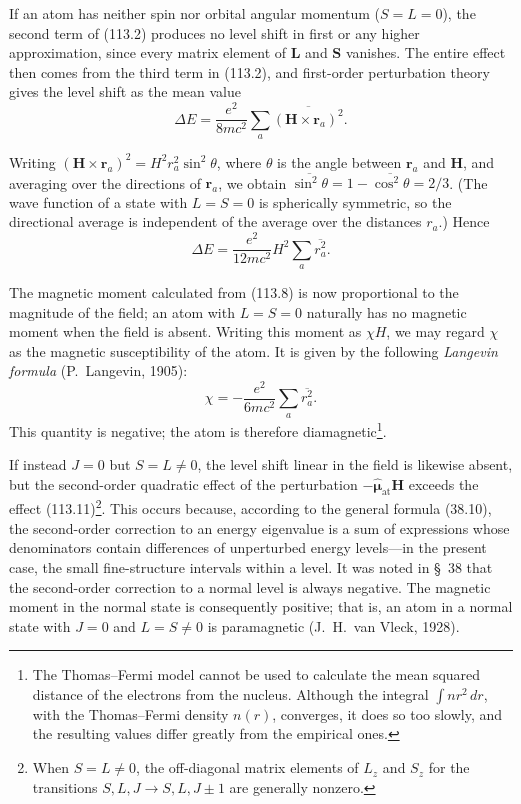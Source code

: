 If an atom has neither spin nor orbital angular momentum ($S=L=0$), the second term of (113.2) produces no level shift in first or any higher approximation, since every matrix element of $\mathbf L$ and $\mathbf S$ vanishes. The entire effect then comes from the third term in (113.2), and first-order perturbation theory gives the level shift as the mean value
\begin{equation}
 \Delta E=\frac{e^2}{8mc^2}\sum_a\overline{(\mathbf H\times\mathbf r_a)^2}.
 \tag{113.10}
\end{equation}

Writing $(\mathbf H\times\mathbf r_a)^2=H^2r_a^2\sin^2\theta$, where $\theta$ is the angle between $\mathbf r_a$ and $\mathbf H$, and averaging over the directions of $\mathbf r_a$, we obtain $\overline{\sin^2\theta}=1-\overline{\cos^2\theta}=2/3$. (The wave function of a state with $L=S=0$ is spherically symmetric, so the directional average is independent of the average over the distances $r_a$.) Hence
\begin{equation}
 \Delta E=\frac{e^2}{12mc^2}H^2\sum_a\overline{r_a^2}.
 \tag{113.11}
\end{equation}

The magnetic moment calculated from (113.8) is now proportional to the magnitude of the field; an atom with $L=S=0$ naturally has no magnetic moment when the field is absent. Writing this moment as $\chi H$, we may regard $\chi$ as the magnetic susceptibility of the atom. It is given by the following \emph{Langevin formula} (P.~Langevin, 1905):
\begin{equation}
 \chi=-\frac{e^2}{6mc^2}\sum_a\overline{r_a^2}.
 \tag{113.12}
\end{equation}
This quantity is negative; the atom is therefore diamagnetic\footnote{The Thomas--Fermi model cannot be used to calculate the mean squared distance of the electrons from the nucleus. Although the integral $\int nr^2\,dr$, with the Thomas--Fermi density $n(r)$, converges, it does so too slowly, and the resulting values differ greatly from the empirical ones.}.

If instead $J=0$ but $S=L\ne0$, the level shift linear in the field is likewise absent, but the second-order quadratic effect of the perturbation $-\hat{\boldsymbol\mu}_{\text{at}}\mathbf H$ exceeds the effect (113.11)\footnote{When $S=L\ne0$, the off-diagonal matrix elements of $L_z$ and $S_z$ for the transitions $S,L,J\to S,L,J\pm1$ are generally nonzero.}. This occurs because, according to the general formula (38.10), the second-order correction to an energy eigenvalue is a sum of expressions whose denominators contain differences of unperturbed energy levels---in the present case, the small fine-structure intervals within a level. It was noted in §~38 that the second-order correction to a normal level is always negative. The magnetic moment in the normal state is consequently positive; that is, an atom in a normal state with $J=0$ and $L=S\ne0$ is paramagnetic (J.~H.~van Vleck, 1928).

